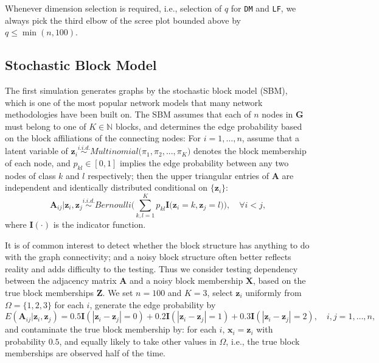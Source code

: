 \documentclass[11pt]{article}
\theoremstyle{definition}
\begin{document}
Whenever dimension selection is required, i.e., selection of $q$ for \texttt{DM} and \texttt{LF}, we always pick the third elbow of the scree plot bounded above by $q \leq \min(n, 100)$. 

\subsection{Stochastic Block Model}

The first simulation generates graphs by the stochastic block model (SBM), which is one of the most popular network models that many network methodologies have been built on. The SBM assumes that each of $n$ nodes in $\mathbf{G}$ must belong to one of $K \in \mathbb{N}$ blocks, and determines the edge probability based on the block affiliations of the connecting nodes: For $i=1,\ldots,n$, assume that a latent variable of $\mathbf{z}_{i} \overset{i.i.d.}{\sim} Multinomial\big( \pi_{1}, \pi_{2}, ... , \pi_{K} \big)$ denotes the block membership of each node, and $p_{kl} \in [0,1]$ implies the edge probability between any two nodes of class $k$ and $l$ respectively; then the upper triangular entries of $\mathbf{A}$ are independent and identically distributed conditional on $\{\mathbf{z}_{i}\}$:
\begin{equation} 
\mathbf{A}_{ij} \big| \mathbf{z}_{i}, \mathbf{z}_{j} \overset{i.i.d.}{\sim} Bernoulli\big( \sum\limits_{k,l=1}^{K} p_{kl} \mathbf{I} \big( \mathbf{z}_{i} = k, \mathbf{z}_{j} = l  \big)    \big), \quad \forall  i < j,
\end{equation}
where $\mathbf{I}(\cdot)$ is the indicator function. %

It is of common interest to detect whether the block structure has anything to do with the graph connectivity; and a noisy block structure often better reflects reality and adds difficulty to the testing. Thus we consider testing dependency between the adjacency matrix $\mathbf{A}$ and a noisy block membership $\mathbf{X}$, based on the true block memberships $\mathbf{Z}$. 
We set $n=100$ and $K=3$, select $\mathbf{z}_i$ uniformly from $\Omega=\{1,2,3\}$ for each $i$, generate the edge probability by
\begin{equation}
\label{eq:Three}
E(\mathbf{A}_{ij} | \mathbf{z}_{i}, \mathbf{z}_{j}) = 0.5 \mathbf{I}(|\mathbf{z}_{i} - \mathbf{z}_{j}| = 0) + 0.2 \mathbf{I}(|\mathbf{z}_{i} - \mathbf{z}_{j}| = 1) + 0.3 \mathbf{I}(|\mathbf{z}_{i} - \mathbf{z}_{j}| = 2), \quad i,j = 1, \ldots, n,
\end{equation} 
and contaminate the true block membership by: for each $i$, $\mathbf{x}_{i}=\mathbf{z}_{i}$ with probability $0.5$, and equally likely to take other values in $\Omega$, i.e., the true block memberships are observed half of the time.
\end{document}
